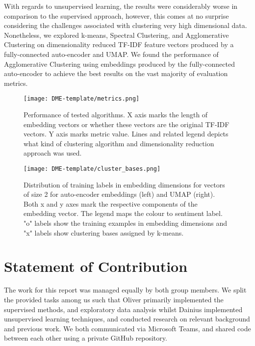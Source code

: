 \documentclass{article}
\begin{document}
With regards to unsupervised learning, the results were considerably worse in comparison to the supervised approach, however, this comes at no surprise considering the challenges associated with clustering very high dimensional data. Nonetheless, we explored k-means, Spectral Clustering, and Agglomerative Clustering on dimensionality reduced TF-IDF feature vectors produced by a fully-connected auto-encoder and UMAP. We found the performance of Agglomerative Clustering using embeddings produced by the fully-connected auto-encoder to achieve the best results on the vast majority of evaluation metrics. 

\begin{figure}[h]
    \centering
    \texttt{[image: DME-template/metrics.png]}
    \caption{Performance of tested algorithms. X axis marks the length of embedding vectors or whether these vectors are the original TF-IDF vectors. Y axis marks metric value. Lines and related legend depicts what kind of clustering algorithm and dimensionality reduction approach was used. }
    \label{fig:metrics}
\end{figure}

\begin{figure}[h]
    \centering
    \texttt{[image: DME-template/cluster\_bases.png]}
    \caption{Distribution of training labels in embedding dimensions for vectors of size 2 for auto-encoder embeddings (left) and UMAP (right). Both x and y axes mark the respective components of the embedding vector. The legend maps the colour to sentiment label. "o" labels show the training examples in embedding dimensions and "x" labels show clustering bases assigned by k-means. }
    \label{fig:cluster-bases}
\end{figure}

\newpage




\section*{Statement of Contribution}

The work for this report was managed equally by both group members. We split the provided tasks among us such that Oliver primarily implemented the supervised methods, and exploratory data analysis whilst Dainius implemented unsupervised learning techniques, and conducted research on relevant background and previous work. We both communicated via Microsoft Teams, and shared code between each other using a private GitHub repository.
\end{document}
